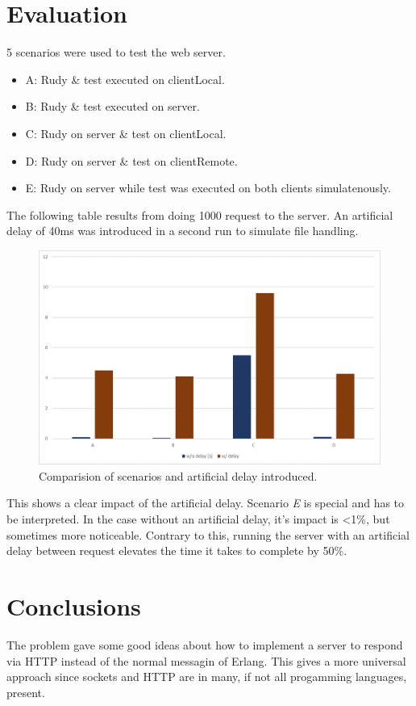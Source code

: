 \documentclass[a4paper, 11pt]{article}
\begin{document}
\section{Evaluation}

5 scenarios were used to test the web server.
\begin{itemize}
    \item A: Rudy \& test executed on clientLocal.
    \item B: Rudy \& test executed on server.
    \item C: Rudy on server \& test on clientLocal.
    \item D: Rudy on server \& test on clientRemote.
    \item E: Rudy on server while test was executed on both clients simulatenously.
\end{itemize}

The following table results from doing 1000 request to the server.
An artificial delay of 40ms was introduced in a second run to simulate file handling.
\begin{figure}[h]
  \begin{center}
    \includegraphics[width=\textwidth,height=\textheight,keepaspectratio]{results1.png}
    \caption{Comparision of scenarios and artificial delay introduced.}
    \label{fig:results}
  \end{center}
\end{figure}


This shows a clear impact of the artificial delay.
Scenario \textit{E} is special and has to be interpreted.
In the case without an artificial delay, it's impact is \textless1\%, but sometimes more noticeable.
Contrary to this, running the server with an artificial delay between request elevates the time it takes to complete by 50\%.

\section{Conclusions}

The problem gave some good ideas about how to implement a server to respond via HTTP instead of the normal messagin of Erlang. This gives a more universal approach since sockets and HTTP are in many, if not all progamming languages, present.
\end{document}
